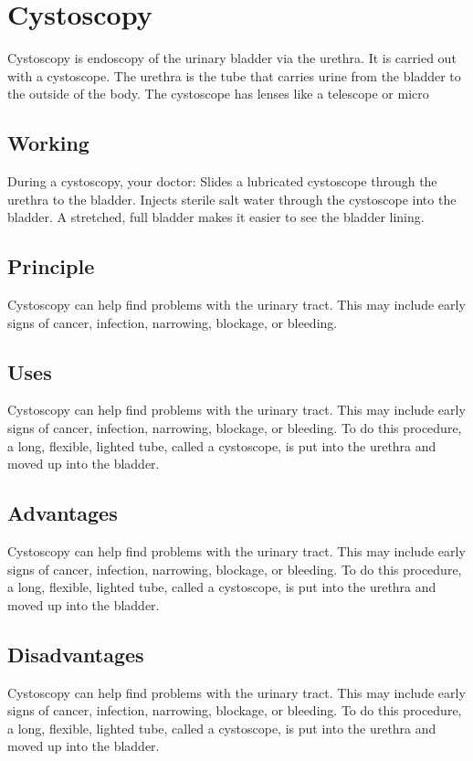 \documentclass[12pt]{article}
\begin{document}
\tableofcontents


\section{Cystoscopy}
Cystoscopy is endoscopy of the urinary bladder via the urethra. It is carried out with a cystoscope. The urethra is the tube that carries urine from the bladder to the outside of the body. The cystoscope has lenses like a telescope or micro





\subsection{Working}
During a cystoscopy, your doctor: Slides a lubricated cystoscope through the urethra to the bladder. Injects sterile salt water through the cystoscope into the bladder. A stretched, full bladder makes it easier to see the bladder lining.

\subsection{Principle}
Cystoscopy can help find problems with the urinary tract. This may include early signs of cancer, infection, narrowing, blockage, or bleeding.

\subsection{Uses}

Cystoscopy can help find problems with the urinary tract. This may include early signs of cancer, infection, narrowing, blockage, or bleeding. To do this procedure, a long, flexible, lighted tube, called a cystoscope, is put into the urethra and moved up into the bladder.

\subsection{Advantages}
Cystoscopy can help find problems with the urinary tract. This may include early signs of cancer, infection, narrowing, blockage, or bleeding. To do this procedure, a long, flexible, lighted tube, called a cystoscope, is put into the urethra and moved up into the bladder.


\subsection{Disadvantages}
Cystoscopy can help find problems with the urinary tract. This may include early signs of cancer, infection, narrowing, blockage, or bleeding. To do this procedure, a long, flexible, lighted tube, called a cystoscope, is put into the urethra and moved up into the bladder.
\end{document}
